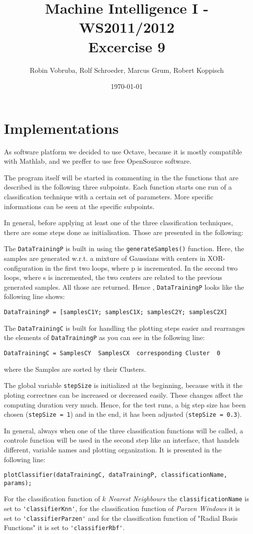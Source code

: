 \documentclass[a4paper,headings=small]{scrartcl}
\title{Machine Intelligence I - WS2011/2012\\Excercise 9}
\author{Robin Vobruba, Rolf Schroeder, Marcus Grum, Robert Koppisch}
\date{\today}
\begin{document}
\maketitle

\section{Implementations}
As software platform we decided to use Octave,
because it is mostly compatible with Mathlab,
and we preffer to use free OpenSource software.

The program itself will be started in commenting in the the functions
that are described in the following three subpoints.
Each function starts one run of a classification technique with a certain set of parameters.
More specific informations can be seen at the specific subpoints.

In general, before applying at least one of the three classification techniques,
there are some steps done as initialisation. Those are presented in the following:

The \verb=DataTrainingP= is built in using the \verb=generateSamples()= function.
Here, the samples are generated w.r.t. a mixture of Gaussians with centers in XOR-configuration
in the first two loops, where p is incremented.
In the second two loops, where s is incremented, the two centers are related to the previous generated samples.
All those are returned. Hence , \verb=DataTrainingP= looks like the following line shows:
\begin{verbatim}
DataTrainingP = [samplesC1Y; samplesC1X; samplesC2Y; samplesC2X]
\end{verbatim}
The \verb=DataTrainingC= is built for handling the plotting steps easier and rearranges the elements
of \verb=DataTrainingP= as you can see in the following line:
\begin{verbatim}
DataTrainingC = SamplesCY  SamplesCX  corresponding Cluster  0
\end{verbatim}
where the Samples are sorted by their Clusters.

The global variable \verb=stepSize= is initialized at the beginning,
because with it the ploting correctnes can be increased or decreased easily.
These changes affect the computing duration very much.
Hence, for the test runs, a big step size has been chosen (\verb#stepSize = 1#) and in the end, it has been adjusted (\verb#stepSize = 0.3#).

In general, always when one of the three classification functions will be called,
a controle function will be used in the second step like an interface, that handels different,
variable names and plotting organization. It is presented in the following line:
\begin{verbatim}
plotClassifier(dataTrainingC, dataTrainingP, classificationName, params);
\end{verbatim}
For the classification function of \emph{$k$ Nearest Neighbours} the \verb=classificationName= is set to \verb='classifierKnn'=,
for the classification function of \emph{Parzen Windows} it is set to \verb='classifierParzen'=
and for the classification function of "Radial Basis Functions" it is set to \verb='classifierRbf'=.
\end{document}
